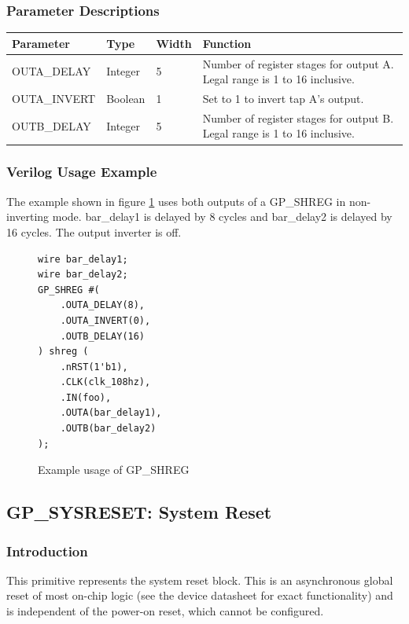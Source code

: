 \documentclass{article}
\begin{document}
\subsubsection{Parameter Descriptions}

\begin{tabularx}{5in}{|l|l|l|X|}
\hline
{\bfseries Parameter} & {\bfseries Type} & {\bfseries Width} & {\bfseries Function} \\
\hline
OUTA\_DELAY & Integer & 5 & Number of register stages for output A. Legal range is 1 to 16 inclusive.\\
\hline
OUTA\_INVERT & Boolean & 1 & Set to 1 to invert tap A's output.\\
\hline
OUTB\_DELAY & Integer & 5 & Number of register stages for output B. Legal range is 1 to 16 inclusive.\\
\hline
\end{tabularx}

\clearpage
\subsubsection{Verilog Usage Example}

The example shown in figure \ref{gp-shreg-example} uses both outputs of a GP\_SHREG in non-inverting mode. 
bar\_delay1 is delayed by 8 cycles and bar\_delay2 is delayed by 16 cycles. The output inverter is off.

\begin{figure}[h]
\begin{lstlisting}
wire bar_delay1;
wire bar_delay2;
GP_SHREG #(
	.OUTA_DELAY(8),
	.OUTA_INVERT(0),
	.OUTB_DELAY(16)
) shreg (
	.nRST(1'b1),
	.CLK(clk_108hz),
	.IN(foo),
	.OUTA(bar_delay1),
	.OUTB(bar_delay2)
);
\end{lstlisting}
\caption{Example usage of GP\_SHREG}
\label{gp-shreg-example}
\end{figure}


\pagebreak
\clearpage
\subsection{GP\_SYSRESET: System Reset}

\subsubsection{Introduction}
This primitive represents the system reset block. This is an asynchronous global reset of most on-chip logic (see the
device datasheet for exact functionality) and is independent of the power-on reset, which cannot be configured.
\end{document}
